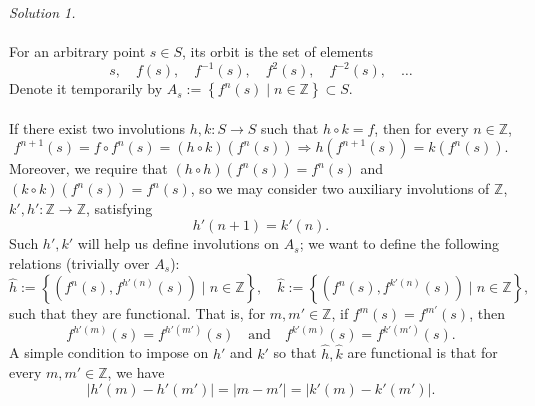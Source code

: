 \begin{solution}
    \textit{Solution 1.}
    \\\\
    For an arbitrary point \( s \in S \), its orbit is the set of elements
    \[
        s,\quad f\left(s\right),\quad f^{-1}\left(s\right),\quad f^{2}\left(s\right),\quad f^{-2}\left(s\right),\quad \ldots
    \]
    Denote it temporarily by \( A_{s} := \left\{ f^n\left(s\right) \mid n \in \mathbb{Z} \right\} \subset S \).
    \\\\
    If there exist two involutions \( h, k : S \rightarrow S \) such that \( h \circ k = f \), then for every \( n \in \mathbb{Z} \),
    \[
        f^{n+1}\left(s\right) = f \circ f^n\left(s\right) = \left(h \circ k\right)\left(f^n\left(s\right)\right) \Rightarrow h\left(f^{n+1}\left(s\right)\right) = k\left(f^n\left(s\right)\right).
    \]
    Moreover, we require that \( \left(h \circ h\right)\left(f^n\left(s\right)\right) = f^n\left(s\right) \) and \( \left(k \circ k\right)\left(f^n\left(s\right)\right) = f^n\left(s\right) \), so we may consider two auxiliary involutions of \( \mathbb{Z} \), \( k', h' : \mathbb{Z} \rightarrow \mathbb{Z} \), satisfying
    \begin{equation}
        \label{2.1} \tag{1} h'\left(n+1\right) = k'\left(n\right).
    \end{equation}
    Such \( h', k' \) will help us define involutions on \( A_s \); we want to define the following relations (trivially over \( A_s \)):
    \[
        \hat{h} := \left\{ \left( f^n\left(s\right), f^{h'\left(n\right)}\left(s\right) \right) \mid n \in \mathbb{Z} \right\}, \quad \hat{k} := \left\{ \left( f^n\left(s\right), f^{k'\left(n\right)}\left(s\right) \right) \mid n \in \mathbb{Z} \right\},
    \]
    such that they are functional. That is, for \( m, m' \in \mathbb{Z} \), if \( f^m\left(s\right) = f^{m'}\left(s\right) \), then
    \[
        f^{h'\left(m\right)}\left(s\right) = f^{h'\left(m'\right)}\left(s\right)\quad \text{and} \quad f^{k'\left(m\right)}\left(s\right) = f^{k'\left(m'\right)}\left(s\right).
    \]
    A simple condition to impose on \( h' \) and \( k' \) so that \( \hat{h}, \hat{k} \) are functional is that for every \( m, m' \in \mathbb{Z} \), we have
    \begin{equation}
        \label{2.2} \tag{2} \left| h'\left(m\right) - h'\left(m'\right) \right| = \left| m - m' \right| = \left| k'\left(m\right) - k'\left(m'\right) \right|.
    \end{equation}

\end{solution}
